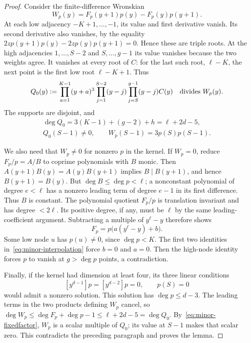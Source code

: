 \begin{proof}
Consider the finite-difference Wronskian
\[
 W_p(y)=F_p(y+1)p(y)-F_p(y)p(y+1).
\]
At each low adjacency $-K+1,\ldots,-1$, its value and first derivative
vanish. Its second derivative also vanishes, by the equality
$2zp(y+1)p(y)-2zp(y)p(y+1)=0$. Hence these are triple roots.
At the high adjacencies $1,\ldots,S-2$ and $S,\ldots,g-1$ its value
vanishes because the two weights agree. It vanishes at every root of $C$:
for the last such root, $\ell-K$, the next point is the first low root
$\ell-K+1$. Thus
\begin{equation}\label{eq:minor-fixedfactor}
 Q_0(y):=\prod_{a=1}^{K-1}(y+a)^3
       \prod_{j=1}^{S-2}(y-j)\prod_{j=S}^{g-1}(y-j)C(y)
       \quad\hbox{divides } W_p(y).
\end{equation}
The supports are disjoint, and
\[
 \begin{gathered}
 \deg Q_0=3(K-1)+(g-2)+h=\ell+2d-5,
 \\ Q_0(S-1)\ne0,\qquad W_p(S-1)=3p(S)p(S-1).
 \end{gathered}
\]

We also need that $W_p\ne0$ for nonzero $p$ in the kernel.
If $W_p=0$, reduce $F_p/p=A/B$ to coprime polynomials with $B$ monic.
Then $A(y+1)B(y)=A(y)B(y+1)$ implies $B\mid B(y+1)$, and hence
$B(y+1)=B(y)$. But $\deg B\le\deg p<\ell$; a nonconstant polynomial
of degree $e<\ell$ has a nonzero leading term of degree $e-1$ in its
first difference. Thus $B$ is constant. The polynomial quotient $F_p/p$
is translation invariant and has degree $<2\ell$. Its positive degree,
if any, must be $\ell$ by the same leading-coefficient argument.
Subtracting a multiple of $y^\ell-y$ therefore shows
\[
 F_p=p\bigl(a(y^\ell-y)+b\bigr).
\]
Some low node $u$ has $p(u)\ne0$, since $\deg p<K$. The first two
identities in~\eqref{eq:minor-interpolation} force $b=0$ and $a=0$.
Then the high-node identity forces $p$ to vanish at $g>\deg p$ points,
a contradiction.

Finally, if the kernel had dimension at least four, its three linear
conditions
\[
 [y^{d-1}]p=[y^{d-2}]p=0,\qquad p(S)=0
\]
would admit a nonzero solution. This solution has $\deg p\le d-3$.
The leading terms in the two products defining $W_p$ cancel, so
$\deg W_p\le\deg F_p+\deg p-1\le\ell+2d-5=\deg Q_0$.
By~\eqref{eq:minor-fixedfactor}, $W_p$ is a scalar multiple of $Q_0$;
its value at $S-1$ makes that scalar zero. This contradicts the preceding
paragraph and proves the lemma.
\end{proof}

